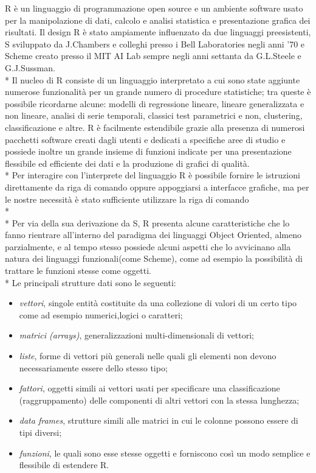 \documentclass[12pt,a4paper,openright,twoside]{report}
\begin{document}
R è un linguaggio di programmazione open source e un ambiente software usato per la manipolazione di dati, calcolo e analisi statistica e presentazione grafica dei risultati. Il design R è stato ampiamente influenzato da due linguaggi preesistenti, S sviluppato da J.Chambers e colleghi presso i Bell Laboratories negli anni '70 e Scheme creato presso il MIT AI Lab sempre negli anni settanta da G.L.Steele e G.J.Sussman. \\*
Il nucleo di R consiste di un linguaggio interpretato a cui sono state aggiunte numerose funzionalità per un grande numero di procedure statistiche;  tra queste è possibile ricordarne alcune: modelli di regressione lineare, lineare generalizzata e non lineare, analisi di serie temporali, classici test parametrici e non, clustering, classificazione e altre. R è facilmente estendibile grazie alla presenza di numerosi pacchetti software creati dagli utenti e dedicati a specifiche aree di studio e possiede inoltre un grande insieme di funzioni indicate per una presentazione flessibile ed efficiente dei dati e la produzione di grafici di qualità.\\*
Per interagire con l'interprete del linguaggio R è possibile fornire le istruzioni direttamente da riga di comando oppure appoggiarsi a interfacce grafiche, ma per le nostre necessità è stato sufficiente utilizzare la riga di comando\\* \\* 
Per via della sua derivazione da S, R presenta alcune caratteristiche che lo fanno rientrare all'interno del paradigma dei linguaggi Object Oriented, almeno parzialmente, e al tempo stesso possiede alcuni aspetti che lo avvicinano alla natura dei linguaggi funzionali(come Scheme), come ad esempio la possibilità di trattare le funzioni stesse come oggetti.\\* Le principali strutture dati sono le seguenti: \begin{itemize}
\item \emph{vettori}, singole entità costituite da una collezione di valori di un certo tipo come ad esempio numerici,logici o caratteri;
\item \emph{matrici (arrays)}, generalizzazioni multi-dimensionali di vettori;
\item \emph{liste}, forme di vettori più generali nelle quali gli elementi non devono necessariamente essere dello stesso tipo;
\item \emph{fattori}, oggetti simili ai vettori usati per specificare una classificazione (raggruppamento) delle componenti di altri vettori con la stessa lunghezza;
\item \emph{data frames}, strutture simili alle matrici in cui le colonne possono essere di tipi diversi;
\item \emph{funzioni}, le quali sono esse stesse oggetti e forniscono così un modo semplice e flessibile di estendere R.
\end{itemize}
\end{document}
